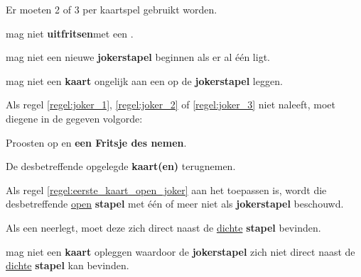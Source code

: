 
\vervolgLijst{}
\item Er moeten 2 of 3 \footnotemark[1] per kaartspel gebruikt worden.
\eindLijst{}

\vervolgLijst{}
\item \EenSpeler mag niet \textbf{uitfritsen}\footnotemark[2] met een \footnotemark[1].
\label{regel:joker_1}
\eindLijst{}

\vervolgLijst{}
\item \EenSpeler mag niet een nieuwe \textbf{jokerstapel} beginnen als er al \'e\'en ligt.
\label{regel:joker_2}
\eindLijst{}

\vervolgLijst{}
\item \EenSpeler mag niet een \textbf{kaart} ongelijk aan een \footnotemark[1] op de \textbf{jokerstapel} leggen.
\label{regel:joker_3}
\eindLijst{}

\vervolgLijst{}
\item Als \eenSpeler regel \ref{regel:joker_1}, \ref{regel:joker_2} of \ref{regel:joker_3} niet naleeft, moet diegene in de gegeven volgorde:
\puntLijst{}
\item Proosten op  en \textbf{een Fritsje des nemen}\footnotemark[3].
\item De desbetreffende opgelegde \textbf{kaart(en)} terugnemen.
\eindPuntLijst{}
\label{regel:kaarten_terugnemen_3}
\eindLijst{}

\vervolgLijst{}
\item Als \Frits regel \ref{regel:eerste_kaart_open_joker} aan het toepassen is, wordt die desbetreffende \ul{open} \textbf{stapel} met \'e\'en of meer  niet als \textbf{jokerstapel} beschouwd.
\eindLijst{}


\vervolgLijst{}
\item Als \eenSpeler een \footnotemark[1] neerlegt, moet deze zich direct naast de \ul{dichte} \textbf{stapel} bevinden.
\label{regel:plaats_joker}
\eindLijst{}

\vervolgLijst{}
\item \EenSpeler mag niet een \textbf{kaart} opleggen waardoor de \textbf{jokerstapel} zich niet direct naast de \ul{dichte} \textbf{stapel} kan bevinden.
\label{regel:joker_4}
\eindLijst{}

